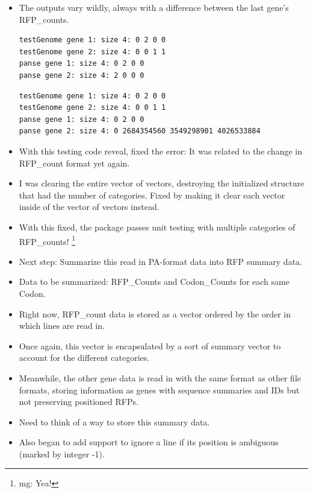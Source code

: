 \documentclass[12pt,hyperref]{labbook}
\newcommand{\sep}{\discretionary{}{}{}} %
\begin{document}
\begin{itemize}
\begin{lstlisting}
        my_print("testGenome gene 1: size %: ", blah1Vect.size());
        for (unsigned i = 0; i < blah1Vect.size(); i++){
            my_print("% ", blah1Vect[i]);
        }
        my_print("\ntestGenome gene 2: size %: ", blah2Vect.size());
        for (unsigned i = 0; i < blah2Vect.size(); i++){
            my_print("% ", blah2Vect[i]);
        }
        my_print("\npanse gene 1: size %: ", blah3Vect.size());
        for (unsigned i = 0; i < blah3Vect.size(); i++){
            my_print("% ", blah3Vect[i]);
        }
        my_print("\npanse gene 2: size %: ", blah4Vect.size());
        for (unsigned i = 0; i < blah4Vect.size(); i++){
            my_print("% ", blah4Vect[i]);
        }
	\end{lstlisting}
	\item The outputs vary wildly, always with a difference between the last gene's RFP\sep \_\sep counts.
	\begin{lstlisting}
testGenome gene 1: size 4: 0 2 0 0 
testGenome gene 2: size 4: 0 0 1 1 
panse gene 1: size 4: 0 2 0 0 
panse gene 2: size 4: 2 0 0 0 
	\end{lstlisting}
	\begin{lstlisting}
testGenome gene 1: size 4: 0 2 0 0 
testGenome gene 2: size 4: 0 0 1 1 
panse gene 1: size 4: 0 2 0 0 
panse gene 2: size 4: 0 2684354560 3549298901 4026533884 
	\end{lstlisting}
	\item With this testing code reveal, fixed the error: It was related to the change in RFP\_count format yet again.
	\item I was clearing the entire vector of vectors, destroying the initialized structure that had the number of categories.
	Fixed by making it clear each vector inside of the vector of vectors instead.
	\item With this fixed, the package passes unit testing with multiple categories of RFP\sep \_\sep counts!
\footnote{mg: Yea!}
	\item Next step: Summarize this read in PA-format data into RFP summary data.
	\item Data to be summarized: RFP\_Counts and Codon\_Counts for each same Codon.
	\item Right now, RFP\_count data is stored as a vector ordered by the order in which lines are read in.
	\item Once again, this vector is encapsulated by a sort of summary vector to account for the different categories.
	\item Meanwhile, the other gene data is read in with the same format as other file formats, storing information as genes with sequence summaries and IDs but not preserving positioned RFPs.
	\item Need to think of a way to store this summary data.
	\item Also began to add support to ignore a line if its position is ambiguous (marked by integer -1).
\end{itemize}
\end{document}
